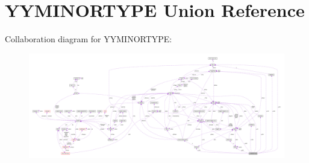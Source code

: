 \hypertarget{unionYYMINORTYPE}{}\section{Y\+Y\+M\+I\+N\+O\+R\+T\+Y\+PE Union Reference}
\label{unionYYMINORTYPE}


Collaboration diagram for Y\+Y\+M\+I\+N\+O\+R\+T\+Y\+PE\+:\nopagebreak
\begin{figure}[H]
\begin{center}
\leavevmode
\includegraphics[width=350pt]{unionYYMINORTYPE__coll__graph}
\end{center}
\end{figure}
